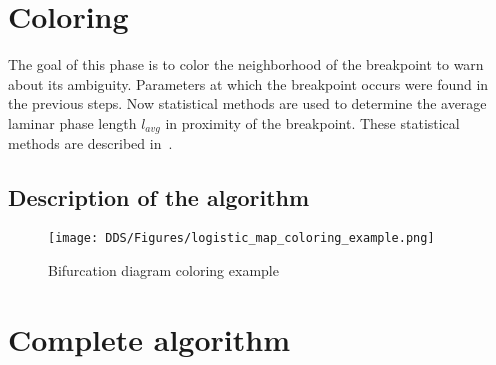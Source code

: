 

\section{Coloring}
The goal of this phase is to color the neighborhood of the breakpoint to warn about its ambiguity.
Parameters at which the breakpoint occurs were found in the previous steps.
Now statistical methods are used to determine the average laminar phase length $l_{avg}$ in proximity of the breakpoint.
These statistical methods are described in~\cite{Elaskar2022}.

\subsection{Description of the algorithm}

\begin{figure}[!h]
    \centering
    \texttt{[image: DDS/Figures/logistic\_map\_coloring\_example.png]}
    \caption{Bifurcation diagram coloring example}
    \label{fig:coloring_example}
\end{figure}

\section{Complete algorithm}

\endinput